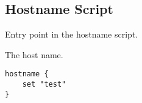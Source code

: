 \subsection{Hostname Script}




Entry point in the hostname script.


The host name.

\begin{lstlisting}[style=Sscontrol,
label={lst:hostname_example_script},
title={Sets the host name.}]
hostname {
    set "test"
}
\end{lstlisting}
